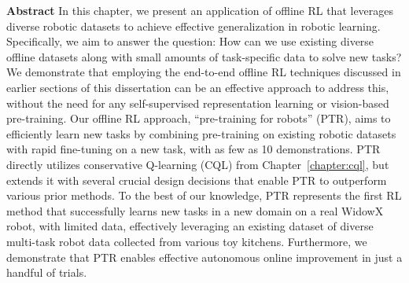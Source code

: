 \documentclass[../thesis.tex]{subfiles}
\begin{document}

\vspace{-0.4cm}
\begin{AIbox}{\large{\textbf{Abstract}}}
\vspace{4mm}
In this chapter, we present an application of offline RL that leverages diverse robotic datasets to achieve effective generalization in robotic learning. Specifically, we aim to answer the question: How can we use existing diverse offline datasets along with small amounts of task-specific data to solve new tasks? We demonstrate that employing the end-to-end offline RL techniques discussed in earlier sections of this dissertation can be an effective approach to address this, without the need for any self-supervised representation learning or vision-based pre-training. Our offline RL approach, ``pre-training for robots'' (PTR), aims to efficiently learn new tasks by combining pre-training on existing robotic datasets with rapid fine-tuning on a new task, with as few as 10 demonstrations. PTR directly utilizes conservative Q-learning (CQL) from Chapter~\ref{chapter:cql}, but extends it with several crucial design decisions that enable PTR to outperform various prior methods. To the best of our knowledge, PTR represents the first RL method that successfully learns new tasks in a new domain on a real WidowX robot, with limited data, effectively leveraging an existing dataset of diverse multi-task robot data collected from various toy kitchens. Furthermore, we demonstrate that PTR enables effective autonomous online improvement in just a handful of trials.
\vspace{2mm}
\end{AIbox}






	




\end{document}
